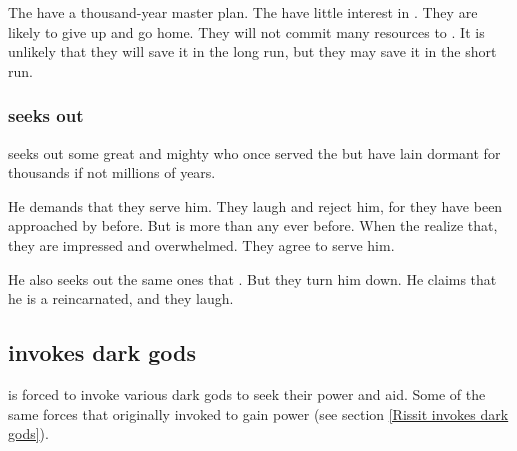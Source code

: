The \banes have a thousand-year master plan.
The \xss have little interest in \Miith.
They are likely to give up and go home. 
They will not commit many resources to \Miith. 
It is unlikely that they will save it in the long run, but they may save it in the short run. 





\subsubsection{\Vizsherioch seeks out \daemons}
\Vizsherioch{} seeks out some great and mighty \daemons{} who once served the \xzaishanns{} but have lain dormant for thousands if not millions of years. 

He demands that they serve him. They laugh and reject him, for they have been approached by \dragons{} before. But \Vizsherioch{} is more \xzaishann{} than any \dragon{} ever before. When the \daemons{} realize that, they are impressed and overwhelmed. They agree to serve him. 

He also seeks out \dash the same ones that . But they turn him down. He claims that he is a \xzaishann{} reincarnated, and they laugh.








\subsection{\Ishnaruchaefir invokes dark gods}
\Ishnaruchaefir{} is forced to invoke various dark gods to seek their power and aid. Some of the same forces that \Secherdamon{} originally invoked to gain power (see section \ref{Rissit invokes dark gods}). 

